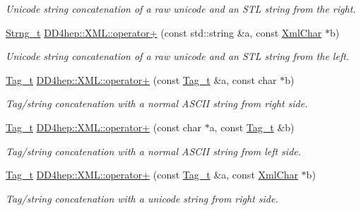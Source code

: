 \begin{DoxyCompactItemize}
\begin{DoxyCompactList}\small\item\em Unicode string concatenation of a raw unicode and an S\+TL string from the right. \end{DoxyCompactList}\item 
\hyperlink{class_d_d4hep_1_1_x_m_l_1_1_strng__t}{Strng\+\_\+t} \hyperlink{group___d_d4_h_e_p___x_m_l_ga2158e654f7603cf773042a5cb231f398}{D\+D4hep\+::\+X\+M\+L\+::operator+} (const std\+::string \&a, const \hyperlink{namespace_d_d4hep_1_1_x_m_l_a09e5d9cc86ed782f6826dfe0778c1815}{Xml\+Char} $\ast$b)
\begin{DoxyCompactList}\small\item\em Unicode string concatenation of a raw unicode and an S\+TL string from the left. \end{DoxyCompactList}\item 
\hyperlink{class_d_d4hep_1_1_x_m_l_1_1_tag__t}{Tag\+\_\+t} \hyperlink{group___d_d4_h_e_p___x_m_l_gacf5fdc46e1dad4d2935283ead3a4c0fd}{D\+D4hep\+::\+X\+M\+L\+::operator+} (const \hyperlink{class_d_d4hep_1_1_x_m_l_1_1_tag__t}{Tag\+\_\+t} \&a, const char $\ast$b)
\begin{DoxyCompactList}\small\item\em Tag/string concatenation with a normal A\+S\+C\+II string from right side. \end{DoxyCompactList}\item 
\hyperlink{class_d_d4hep_1_1_x_m_l_1_1_tag__t}{Tag\+\_\+t} \hyperlink{group___d_d4_h_e_p___x_m_l_ga16ba3dffdb36f1a0ae319fde7dcdb5ca}{D\+D4hep\+::\+X\+M\+L\+::operator+} (const char $\ast$a, const \hyperlink{class_d_d4hep_1_1_x_m_l_1_1_tag__t}{Tag\+\_\+t} \&b)
\begin{DoxyCompactList}\small\item\em Tag/string concatenation with a normal A\+S\+C\+II string from left side. \end{DoxyCompactList}\item 
\hyperlink{class_d_d4hep_1_1_x_m_l_1_1_tag__t}{Tag\+\_\+t} \hyperlink{group___d_d4_h_e_p___x_m_l_ga658bb45f4c5cc614a2508957b27c0bd7}{D\+D4hep\+::\+X\+M\+L\+::operator+} (const \hyperlink{class_d_d4hep_1_1_x_m_l_1_1_tag__t}{Tag\+\_\+t} \&a, const \hyperlink{namespace_d_d4hep_1_1_x_m_l_a09e5d9cc86ed782f6826dfe0778c1815}{Xml\+Char} $\ast$b)
\begin{DoxyCompactList}\small\item\em Tag/string concatenation with a unicode string from right side. \end{DoxyCompactList}\item 

\end{DoxyCompactItemize}
